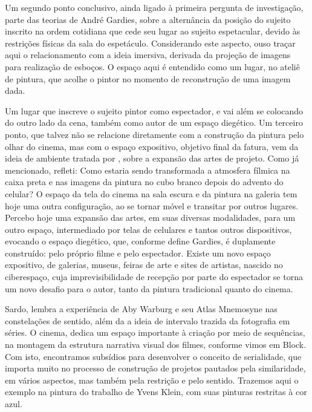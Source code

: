 Um segundo ponto conclusivo, ainda ligado à primeira pergunta de
investigação, parte das teorias de André Gardies, sobre a alternância
da posição do sujeito inscrito na ordem cotidiana que cede seu lugar ao
sujeito espetacular, devido às restrições físicas da sala do
espetáculo. Considerando este aspecto, ouso traçar aqui o
relacionamento com a ideia imersiva, derivada da projeção de imagens
para realização de esboços. O espaço aqui é entendido como um lugar, no
ateliê de pintura, que acolhe o pintor no momento de reconstrução de
uma imagem dada.

Um lugar que inscreve o sujeito pintor como espectador, e vai além se
colocando do outro lado da cena, também como autor de um espaço
diegético. Um terceiro ponto, que talvez não se relacione diretamente
com a construção da pintura pelo olhar do cinema, mas com o espaço
expositivo, objetivo final da fatura, vem da ideia de ambiente tratada
por \textcite{sardo2017exercicio}, sobre a expansão das artes de projeto. Como já
mencionado, refleti: Como estaria sendo transformada a atmosfera
fílmica na caixa preta e nas imagens da pintura no cubo branco depois
do advento do celular? O espaço da tela do cinema na sala escura e da
pintura na galeria tem hoje uma outra configuração, ao se tornar móvel
e transitar por outros lugares. Percebo hoje uma expansão das artes, em
suas diversas modalidades, para um outro espaço, intermediado por telas
de celulares e tantos outros dispositivos, evocando o espaço diegético,
que, conforme define Gardies, é duplamente construído: pelo próprio
filme e pelo espectador. Existe um novo espaço expositivo, de galerias,
museus, feiras de arte e sites de artistas, nascido no ciberespaço,
cuja imprevisibilidade de recepção por parte do espectador se torna um
novo desafio para o autor, tanto da pintura tradicional quanto do
cinema.

Sardo, lembra a experiência de Aby Warburg e seu Atlas Mnemosyne nas
constelações de sentido, além da a ideia de intervalo trazida da
fotografia em séries. O cinema, dedica um espaço importante à criação
por meio de sequências, na montagem da estrutura narrativa visual dos
filmes, conforme vimos em Block. Com isto, encontramos subsídios para
desenvolver o conceito de serialidade, que importa muito no processo de
construção de projetos pautados pela similaridade, em vários aspectos,
mas também pela restrição e pelo sentido. Trazemos aqui o exemplo na
pintura do trabalho de Yvens Klein, com suas pinturas restritas à cor
azul.

